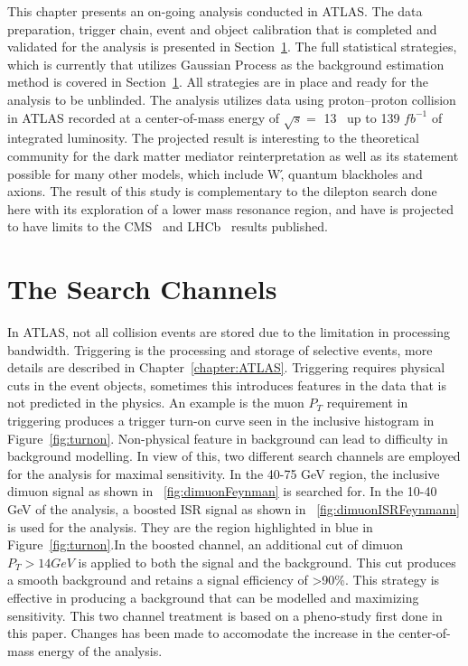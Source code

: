 This chapter presents an on-going analysis conducted in ATLAS. The data preparation, trigger chain, event and object calibration that is completed and validated for the analysis is presented in Section~\ref{}. The full statistical strategies, which is currently that utilizes Gaussian Process as the background estimation method is covered in Section~\ref{}. All strategies are in place and ready for the analysis to be unblinded. The analysis utilizes data using proton--proton collision in ATLAS recorded at a center-of-mass energy of $\sqrt{s}=$ 13 ~\TeV up to 139 $fb^{-1}$ of integrated luminosity. The projected result is interesting to the theoretical community for the dark matter mediator reinterpretation as well as its statement possible for many other models, which include W\', quantum blackholes and axions. The result of this study is complementary to the dilepton search done here with its exploration of a lower mass resonance region, and have is projected to have limits to the CMS~\cite{} and LHCb~\cite{} results published.


%


\section{The Search Channels}
In ATLAS, not all collision events are stored due to the limitation in processing bandwidth. Triggering is the processing and storage of selective events, more details are described in Chapter~\ref{chapter:ATLAS}. Triggering requires physical cuts in the event objects, sometimes this introduces features in the data that is not predicted in the physics. An example is the muon $P_{T}$ requirement in triggering produces a trigger turn-on curve seen in the inclusive histogram in Figure~\ref{fig:turnon}.
Non-physical feature in background can lead to difficulty in background modelling. In view of this, two different search channels are employed for the analysis for maximal sensitivity. In the 40-75 GeV region, the inclusive dimuon signal as shown in ~\ref{fig:dimuonFeynman} is searched for. In the 10-40 GeV of the analysis, a boosted ISR signal as shown in ~\ref{fig:dimuonISRFeynmann} is used for the analysis. They are the region highlighted in blue in Figure~\ref{fig:turnon}.In the boosted channel, an additional cut of dimuon $P_{T}>14 GeV$ is applied to both the signal and the background. This cut produces a smooth background and retains a signal efficiency of >90\%. This strategy is effective in producing a background that can be modelled and maximizing sensitivity. 
This two channel treatment is based on a pheno-study first done in this paper\cite{2014}. Changes has been made to accomodate the increase in the center-of-mass energy of the analysis. 

